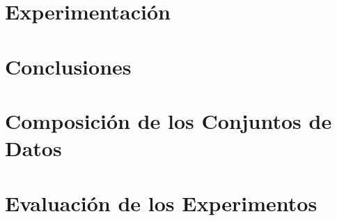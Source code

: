     \chapter{Experimentación}\label{ch:results}
    

    \backmatter

    \chapter*{Conclusiones}\label{ch:conclusion}
    

    

    \appendix

    \chapter{Composición de los Conjuntos de Datos}\label{ch:datasetsComposition}
    

    \chapter{Evaluación de los Experimentos}\label{ch:experimentsResults}
    
